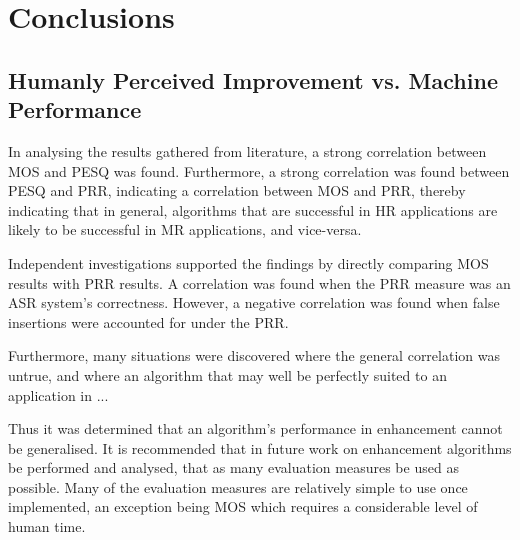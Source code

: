 
\chapter{Conclusions}

\acresetall


\section{Humanly Perceived Improvement vs. Machine Performance}

In analysing the results gathered from literature, a strong correlation
between \ac{MOS} and \ac{PESQ} was found. Furthermore, a strong
correlation was found between \ac{PESQ} and \ac{PRR}, indicating
a correlation between \ac{MOS} and \ac{PRR}, thereby indicating
that in general, algorithms that are successful in \ac{HR} applications
are likely to be successful in \ac{MR} applications, and vice-versa.

Independent investigations supported the findings by directly comparing
\ac{MOS} results with \ac{PRR} results. A correlation was found
when the \ac{PRR} measure was an \ac{ASR} system's correctness.
However, a negative correlation was found when false insertions were
accounted for under the \ac{PRR}.

Furthermore, many situations were discovered where the general correlation
was untrue, and where an algorithm that may well be perfectly suited
to an application in ...

Thus it was determined that an algorithm's performance in enhancement
cannot be generalised. It is recommended that in future work on enhancement
algorithms be performed and analysed, that as many evaluation measures
be used as possible. Many of the evaluation measures are relatively
simple to use once implemented, an exception being \ac{MOS} which
requires a considerable level of human time.
